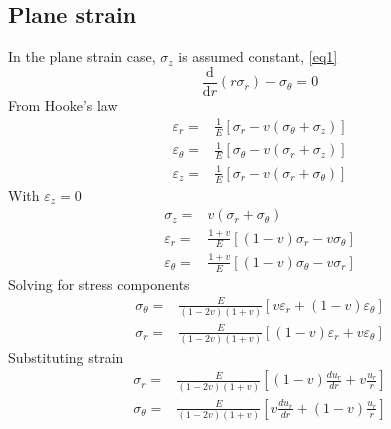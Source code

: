 \documentclass[11pt]{article} %
\begin{document}
\subsection{Plane strain}
In the plane strain case, $\sigma_z$ is assumed constant, \cref{eq1}
\begin{equation}\nonumber
\frac{\mathrm{d}}{\mathrm{d}r}(r\sigma_r)-\sigma_\theta=0
\end{equation}
From Hooke's law\cite{hooke1678}
\begin{equation}\nonumber
\begin{aligned}
\varepsilon_{r}=&\frac{1}{E}\left[\sigma_{r}-v\left(\sigma_{\theta}+\sigma_{z}\right)\right]\\
\varepsilon_{\theta}=&\frac{1}{E}\left[\sigma_{\theta}-v\left(\sigma_{r}+\sigma_{z}\right)\right]\\
\varepsilon_{z}=&\frac{1}{E}\left[\sigma_{r}-v\left(\sigma_{r}+\sigma_{\theta}\right)\right]
\end{aligned}
\end{equation}
With
 $\varepsilon_z=0$
\begin{equation}\nonumber
\begin{aligned}
\sigma_{z}=&v\left(\sigma_{r}+\sigma_{\theta}\right)\\
\varepsilon_{r}=&\frac{1+v}{E}\left[(1-v) \sigma_{r}-v \sigma_{\theta}\right]\\
\varepsilon_{\theta}=&\frac{1+v}{E}\left[(1-v) \sigma_{\theta}-v \sigma_{r}\right]
\end{aligned}
\end{equation}
Solving for stress components
\begin{equation}\nonumber
\begin{aligned}
\sigma_{\theta}=&\frac{E}{(1-2 v)(1+v)}\left[v \varepsilon_{r}+(1-v) \varepsilon_{\theta}\right]\\
\sigma_{r}=&\frac{E}{(1-2 v)(1+v)}\left[(1-v) \varepsilon_{r}+v \varepsilon_{\theta}\right]
\end{aligned}\end{equation}
Substituting strain
\begin{equation}\label{eq4}
\begin{aligned}
\sigma_{r}=&\frac{E}{(1-2 v)(1+v)}\left[(1-v) \frac{d u_{r}}{d r}+v \frac{u_{r}}{r}\right]\\
\sigma_{\theta}=&\frac{E}{(1-2 v)(1+v)}\left[v \frac{d u_{r}}{d r}+(1-v) \frac{u_{r}}{r}\right]\\
\end{aligned}
\end{equation}
\end{document}
